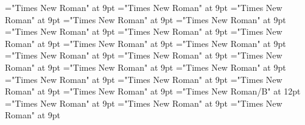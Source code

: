 \documentclass[gps1,twoside]{article}
\begin{document}
\font\abbreviationacademicdomainacademicdomainssensesensessensesensesentrybefore="Times New Roman" at 9pt
\font\nameacademicdomainacademicdomainssensesensessensesensesentrybefore="Times New Roman" at 9pt
\font\spannameacademicdomainacademicdomainssensesensessensesensesentryfirstchildbefore="Times New Roman" at 9pt
\font\spannameacademicdomainacademicdomainssensesensessensesensesentrylastchildafter="Times New Roman" at 9pt
\font\usageusageusagessensesensessensesensesentrybefore="Times New Roman" at 9pt
\font\usagessensesensessensesensesentrybefore="Times New Roman" at 9pt
\font\usagessensesensessensesensesentryafter="Times New Roman" at 9pt
\font\abbreviationusageusagessensesensessensesensesentrybefore="Times New Roman" at 9pt
\font\complexformsnotsubentrycomplexformsnotsubentrycomplexformsnotsubentriessensesensessensesensesentrybefore="Times New Roman" at 9pt
\font\complexformsnotsubentriessensesensessensesensesentryafter="Times New Roman" at 9pt
\font\complexformtypescomplexformsnotsubentrycomplexformsnotsubentriessensesensessensesensesentryafter="Times New Roman" at 9pt
\font\reverseabbrcomplexformtypecomplexformtypescomplexformsnotsubentrycomplexformsnotsubentriessensesensessensesensesentrybefore="Times New Roman" at 9pt
\font\headwordcomplexformsnotsubentrycomplexformsnotsubentriessensesensessensesensesentrybefore="Times New Roman" at 9pt
\font\owningentrysummarydefinitioncomplexformsnotsubentrycomplexformsnotsubentriessensesensessensesensesentrybefore="Times New Roman" at 9pt
\font\spanowningentrysummarydefinitioncomplexformsnotsubentrycomplexformsnotsubentriessensesensessensesensesentryfirstchildbefore="Times New Roman" at 9pt
\font\spanowningentrysummarydefinitioncomplexformsnotsubentrycomplexformsnotsubentriessensesensessensesensesentrylastchildafter="Times New Roman" at 9pt
\font\nontrivialentryrootnontrivialentryrootnontrivialentryrootscomplexformsnotsubentrycomplexformsnotsubentriessensesensessensesensesentrybefore="Times New Roman" at 9pt
\font\nontrivialentryrootscomplexformsnotsubentrycomplexformsnotsubentriessensesensessensesensesentrybefore="Times New Roman" at 9pt
\font\nontrivialentryrootscomplexformsnotsubentrycomplexformsnotsubentriessensesensessensesensesentryafter="Times New Roman" at 9pt
\font\nontrivialentryrootnontrivialentryrootscomplexformsnotsubentrycomplexformsnotsubentriessensesensessensesensesentry="Times New Roman/B" at 12pt
\font\complexformsnotsubentrycomplexformsnotsubentrycomplexformsnotsubentriesentrybefore="Times New Roman" at 9pt
\font\complexformsnotsubentriesentryafter="Times New Roman" at 9pt
\font\complexformtypescomplexformsnotsubentrycomplexformsnotsubentriesentryafter="Times New Roman" at 9pt
\end{document}
